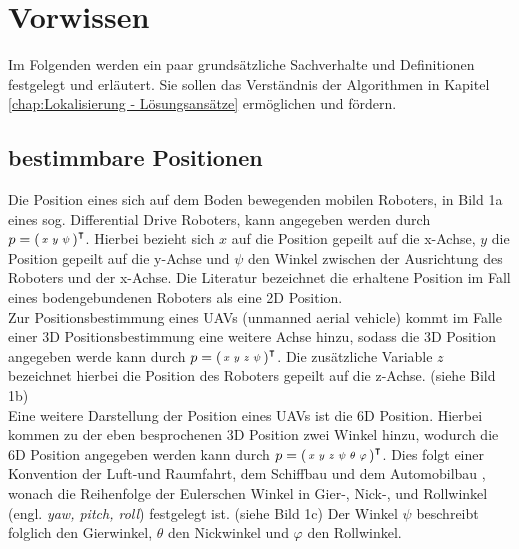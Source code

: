 \clearpage
\chapter{\textbf{Vorwissen}}\label{chap:Vorwissen}
Im Folgenden werden ein paar grundsätzliche Sachverhalte und Definitionen festgelegt und erläutert. Sie sollen das Verständnis der Algorithmen in Kapitel \ref{chap:Lokalisierung - Lösungsansätze} ermöglichen und fördern. 


\section{bestimmbare Positionen}\label{sec:bestimmbare Positionen}
Die Position eines sich auf dem Boden bewegenden mobilen Roboters, in Bild 1a  eines sog. Differential Drive Roboters, kann angegeben werden durch 
$p=\mathbf{\begin{psmallmatrix}
x & y & \psi
\end{psmallmatrix}}^\intercal$.
Hierbei bezieht sich $x$ auf die Position gepeilt auf die x-Achse, $y$ die Position gepeilt auf die y-Achse und $\psi$  den Winkel zwischen der Ausrichtung des Roboters und der x-Achse. Die Literatur bezeichnet die erhaltene Position im Fall eines bodengebundenen Roboters als eine 2D Position.\\
Zur Positionsbestimmung eines UAVs (unmanned aerial vehicle) kommt im Falle einer 3D Positionsbestimmung eine weitere Achse hinzu, sodass die 3D Position angegeben werde kann durch
$p=\mathbf{\begin{psmallmatrix}
x & y & z & \psi
\end{psmallmatrix}}^\intercal$.
Die zusätzliche Variable $z$ bezeichnet hierbei die Position des Roboters gepeilt auf die z-Achse. (siehe Bild 1b)\\
Eine weitere Darstellung der Position eines UAVs ist die 6D Position. Hierbei kommen zu der eben besprochenen 3D Position zwei Winkel hinzu, wodurch die 6D Position angegeben werden kann durch
$p=\mathbf{\begin{psmallmatrix}
x & y & z & \psi & \theta & \varphi
\end{psmallmatrix}}^\intercal$.
Dies folgt einer Konvention der Luft-und Raumfahrt, dem Schiffbau und dem Automobilbau \cite{website:cosmos-indirekt}, wonach die Reihenfolge der Eulerschen Winkel in Gier-, Nick-, und Rollwinkel (engl. \textit{yaw, pitch, roll}) festgelegt ist. (siehe Bild 1c) Der Winkel $\psi$ beschreibt folglich den Gierwinkel, $\theta$ den Nickwinkel und $\varphi$ den Rollwinkel.\\

